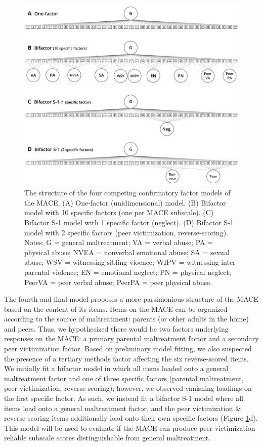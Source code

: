 \documentclass[letterpaper,man,natbib,noextraspace,floatsintext,longtable]{apa6}
\begin{document}
\begin{figure}[t!]
    \centering
    \includegraphics[width=1.1\textwidth,center]{figures/fig01.png}
    \captionsetup{width=1.1\textwidth}
    \caption{\normalfont The structure of the four competing confirmatory factor models of the MACE. (A) One-factor (unidimensional) model. (B) Bifactor model with 10 specific factors (one per MACE subscale). (C) Bifactor S-1 model with 1 specific factor (neglect). (D) Bifactor S-1 model with 2 specific factors (peer victimization, reverse-scoring). Notes: G = general maltreatment; VA = verbal abuse; PA = physical abuse; NVEA = nonverbal emotional abuse; SA = sexual abuse; WSV = witnessing sibling vioence; WIPV = witnessing inter-parental violence; EN = emotional neglect; PN = physical neglect; PeerVA = peer verbal abuse; PeerPA = peer physical abuse.}
    \label{fig:models}
\end{figure}

The fourth and final model proposes a more parsimonious structure of the MACE based on the content of its items. Items on the MACE can be organized according to the source of maltreatment: parents (or other adults in the home) and peers. Thus, we hypothesized there would be two factors underlying responses on the MACE: a primary parental maltreatment factor and a secondary peer victimization factor. Based on preliminary model fitting, we also suspected the presence of a tertiary methods factor affecting the six reverse-scored items. We initially fit a bifactor model in which all items loaded onto a general maltreatment factor and one of three specific factors (parental maltreatment, peer victimization, reverse-scoring); however, we observed vanishing loadings on the first specific factor. As such, we instead fit a bifactor S-1 model where all items load onto a general maltreatment factor, and the peer victimization \& reverse-scoring items additionally load onto their own specific factors (Figure \ref{fig:models}d). This model will be used to evaluate if the MACE can produce peer victimization reliable subscale scores distinguishable from general maltreatment. 
\end{document}
